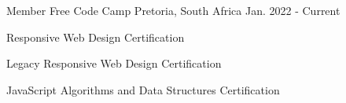 

\begin{cventries}



  \cventry
    {Member} %
    {Free Code Camp} %
    {Pretoria, South Africa} %
    {Jan. 2022 - Current} %
    {
      \begin{cvitems} %
        \item {Responsive Web Design Certification}
        \item {Legacy Responsive Web Design Certification}
        \item {JavaScript Algorithms and Data Structures Certification}
      \end{cvitems}
    }

\end{cventries}
